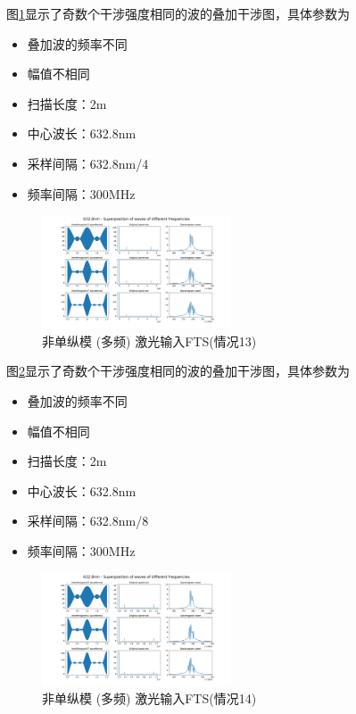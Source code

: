 \documentclass[conference]{IEEEtran}
\begin{document}
图\ref{pic22}显示了奇数个干涉强度相同的波的叠加干涉图，具体参数为
\begin{itemize}
    \item 叠加波的频率不同
    \item 幅值不相同
    \item 扫描长度：2m
    \item 中心波长：632.8nm
    \item 采样间隔：632.8nm/4
    \item 频率间隔：300MHz
\end{itemize}
\begin{figure}[htbp]
    \centerline{\includegraphics[width=0.5\textwidth]{pic22.png}}
    \caption{非单纵模 (多频) 激光输入FTS(情况13)}
    \label{pic22}
\end{figure}

图\ref{pic23}显示了奇数个干涉强度相同的波的叠加干涉图，具体参数为
\begin{itemize}
    \item 叠加波的频率不同
    \item 幅值不相同
    \item 扫描长度：2m
    \item 中心波长：632.8nm
    \item 采样间隔：632.8nm/8
    \item 频率间隔：300MHz
\end{itemize}
\begin{figure}[htbp]
    \centerline{\includegraphics[width=0.5\textwidth]{pic23.png}}
    \caption{非单纵模 (多频) 激光输入FTS(情况14)}
    \label{pic23}
\end{figure}
\end{document}
